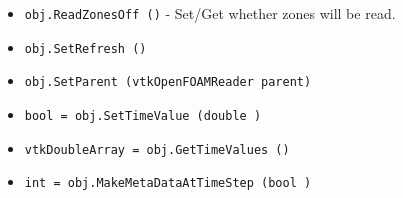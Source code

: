 \begin{itemize}
\item  \verb|obj.ReadZonesOff ()| -  Set/Get whether zones will be read.

\item  \verb|obj.SetRefresh ()|

\item  \verb|obj.SetParent (vtkOpenFOAMReader parent)|

\item  \verb|bool = obj.SetTimeValue (double )|

\item  \verb|vtkDoubleArray = obj.GetTimeValues ()|

\item  \verb|int = obj.MakeMetaDataAtTimeStep (bool )|

\end{itemize}

